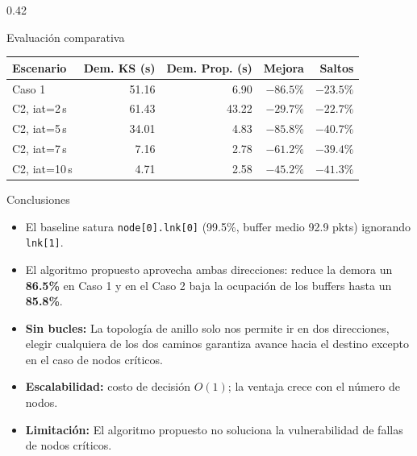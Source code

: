 \documentclass[final]{beamer}
\begin{document}
\begin{frame}[t]
\begin{columns}[T,totalwidth=0.96\paperwidth]
\begin{column}{0.42\paperwidth}
\begin{block}{Evaluación comparativa}
    \vspace{0.75cm}
    \raggedright
    \renewcommand{\arraystretch}{1.2}
    \begin{tabular}{@{}lrrrr@{}}
      \toprule
      \textbf{Escenario} & \textbf{Dem. KS (s)} & \textbf{Dem. Prop. (s)} & \textbf{Mejora} & \textbf{Saltos} \\
      \midrule
      Caso 1            & 51.16 & 6.90 & $-86.5\%$ & $-23.5\%$ \\
      C2, iat=2\,s      & 61.43 & 43.22 & $-29.7\%$ & $-22.7\%$ \\
      C2, iat=5\,s      & 34.01 & 4.83  & $-85.8\%$ & $-40.7\%$ \\
      C2, iat=7\,s      & 7.16  & 2.78  & $-61.2\%$ & $-39.4\%$ \\
      C2, iat=10\,s     & 4.71  & 2.58  & $-45.2\%$ & $-41.3\%$ \\
      \bottomrule
    \end{tabular}
  \end{block}

  \vspace{0.45cm}

  \begin{alertblock}{Conclusiones}
    \begin{itemize}
      \item El baseline satura \texttt{node[0].lnk[0]} (99.5\%, buffer medio 92.9 pkts) ignorando \texttt{lnk[1]}.
      \item El algoritmo propuesto aprovecha ambas direcciones: reduce la demora un \textbf{86.5\%} en Caso 1 y en el Caso 2 baja la ocupación de los buffers hasta un \textbf{85.8\%}.
      \item \textbf{Sin bucles:} La topología de anillo solo nos permite ir en dos direcciones, elegir cualquiera de los dos caminos garantiza avance hacia el destino excepto en el caso de nodos críticos.
      \item \textbf{Escalabilidad:} costo de decisión $O(1)$; la ventaja crece con el número de nodos.
      \item \textbf{Limitación:} El algoritmo propuesto no soluciona la vulnerabilidad de fallas de nodos críticos.
    \end{itemize}
  \end{alertblock}

\end{column}

\end{columns}

\end{frame}
\end{document}
